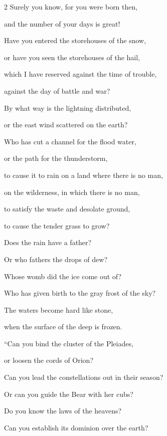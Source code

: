 \begin{multicols}{2}
	\myverse{}Surely you know, for you were born then,
	
	and the number of your days is great!
	
	\myverse{}Have you entered the storehouses of the snow,
	
	or have you seen the storehouses of the hail,
	
	\myverse{}which I have reserved against the time of trouble,
	
	against the day of battle and war?
	
	\myverse{}By what way is the lightning distributed,
	
	or the east wind scattered on the earth?
	
	\vspace{\baselineskip}
	
	\myverse{}Who has cut a channel for the flood water,
	
	or the path for the thunderstorm,
	
	\myverse{}to cause it to rain on a land where there is no man,
	
	on the wilderness, in which there is no man,
	
	\myverse{}to satisfy the waste and desolate ground,
	
	to cause the tender grass to grow?
	
	\myverse{}Does the rain have a father?
	
	Or who fathers the drops of dew?
	
	\myverse{}Whose womb did the ice come out of?
	
	Who has given birth to the gray frost of the sky?
	
	\myverse{}The waters become hard like stone,
	
	when the surface of the deep is frozen.
	
	\vspace{\baselineskip}
	
	
	\myverse{}“Can you bind the cluster of the Pleiades,
	
	or loosen the cords of Orion?
	
	\myverse{}Can you lead the constellations out in their season?
	
	Or can you guide the Bear with her cubs?
	
	\myverse{}Do you know the laws of the heavens?
	
	Can you establish its dominion over the earth?
	
	\vspace{\baselineskip}
	

\end{multicols}
